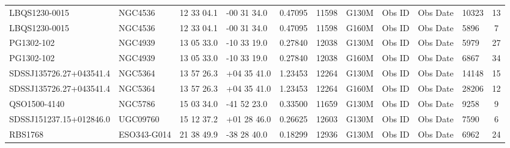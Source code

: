 \documentclass[iop]{emulateapj-rtx4}
\begin{document}
\begin{table}[ht]
\begin{center}
\begin{tabular}{l l l l l l l l l l c}
LBQS1230-0015  			&      NGC4536  		&      12  33  04.1  		&	-00  31  34.0  	&   0.47095  	& 11598		&   G130M	&   Obs ID  & Obs Date  & 10323  &      13          \\
LBQS1230-0015  			&      NGC4536  		&      12  33  04.1  		&	-00  31  34.0  	&   0.47095  	& 11598		&   G160M	&   Obs ID  & Obs Date  & 5896  &       7            \\
PG1302-102  				&      NGC4939  		&      13  05  33.0  		&	-10  33  19.0  	&   0.27840  	& 12038		&   G130M	&   Obs ID  & Obs Date  & 5979  &       27          \\
PG1302-102  				&      NGC4939  		&      13  05  33.0  		&	-10  33  19.0  	&   0.27840  	& 12038		&   G160M	&   Obs ID  & Obs Date  & 6867  &       34          \\
SDSSJ135726.27+043541.4  	&	NGC5364  		&      13  57  26.3  		&	+04  35  41.0  	&   1.23453  	& 12264		&   G130M	&   Obs ID  & Obs Date  & 14148  &      15           \\
SDSSJ135726.27+043541.4  	& 	NGC5364  		&      13  57  26.3  		&	+04  35  41.0  	&   1.23453  	& 12264		&   G160M	&   Obs ID  & Obs Date  & 28206  &      12          \\
QSO1500-4140  			&      NGC5786  		&      15  03  34.0  		&	-41  52  23.0  	&   0.33500  	& 11659		&   G130M	&   Obs ID  & Obs Date  & 9258  &       9           \\
SDSSJ151237.15+012846.0  	& 	UGC09760  		&      15  12  37.2  		&	+01  28  46.0  	&   0.26625  	& 12603		&   G130M	&   Obs ID  & Obs Date  & 7590  &       6           \\
RBS1768  				&      ESO343-G014  	&   	21  38  49.9  		&	-38  28  40.0  	&   0.18299  	& 12936		&   G130M	&   Obs ID  & Obs Date  & 6962  &       24          \\

\end{tabular}
\end{center}
\end{table}
\end{document}
